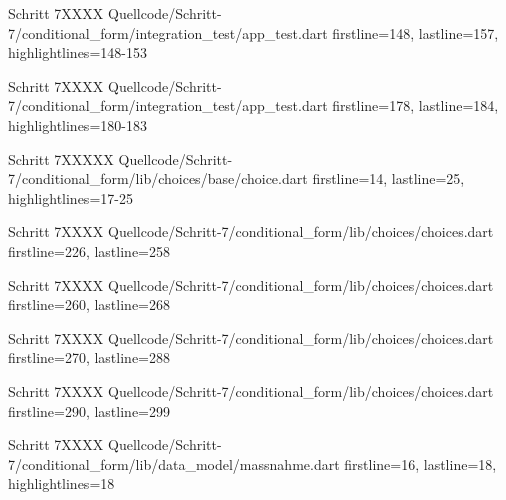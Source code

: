 \begin{alexlisting}{Schritt 7}{XXXX}
    {Quellcode/Schritt-7/conditional_form/integration_test/app_test.dart}
    {firstline=148, lastline=157, highlightlines={148-153}}
    \label{lst:Schritt5XXXX}
  \end{alexlisting}

  \begin{alexlisting}{Schritt 7}{XXXX}
    {Quellcode/Schritt-7/conditional_form/integration_test/app_test.dart}
    {firstline=178, lastline=184, highlightlines={180-183}}
    \label{lst:Schritt5XXXX}
  \end{alexlisting}


  \begin{alexlisting}{Schritt 7}{XXXXX}
    {Quellcode/Schritt-7/conditional_form/lib/choices/base/choice.dart}
    {firstline=14, lastline=25, highlightlines={17-25}}
    \label{lst:Schritt4XXXXX}
  \end{alexlisting}

  \begin{alexlisting}{Schritt 7}{XXXX}
    {Quellcode/Schritt-7/conditional_form/lib/choices/choices.dart}
    {firstline=226, lastline=258}
    \label{lst:Schritt5XXXX}
  \end{alexlisting}

  \begin{alexlisting}{Schritt 7}{XXXX}
    {Quellcode/Schritt-7/conditional_form/lib/choices/choices.dart}
    {firstline=260, lastline=268}
    \label{lst:Schritt5XXXX}
  \end{alexlisting}

  \begin{alexlisting}{Schritt 7}{XXXX}
    {Quellcode/Schritt-7/conditional_form/lib/choices/choices.dart}
    {firstline=270, lastline=288}
    \label{lst:Schritt5XXXX}
  \end{alexlisting}

  \begin{alexlisting}{Schritt 7}{XXXX}
    {Quellcode/Schritt-7/conditional_form/lib/choices/choices.dart}
    {firstline=290, lastline=299}
    \label{lst:Schritt5XXXX}
  \end{alexlisting}


  \begin{alexlisting}{Schritt 7}{XXXX}
    {Quellcode/Schritt-7/conditional_form/lib/data_model/massnahme.dart}
    {firstline=16, lastline=18, highlightlines={18}}
    \label{lst:Schritt5XXXX}
  \end{alexlisting}

